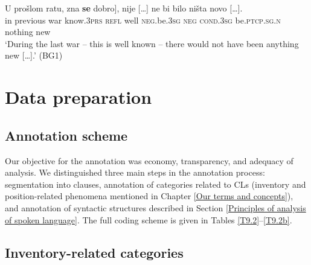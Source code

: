 \begin{enumerate}
\begin{exe}
\ex\label{(9.42)}
\gll U prošlom ratu, \minsp{[} zna \textbf{se} dobro], nije [\dots] ne bi bilo ništa {novo  [\dots].} \\
in previous war {} know.\textsc{3prs} \textsc{refl} well \textsc{neg}.be.3\textsc{sg} {} \textsc{neg} \textsc{cond}.\textsc{3sg} be.\textsc{ptcp}.\textsc{sg}.\textsc{n} nothing new \\
\glt ‘During the last war – this is well known – there would not have been anything new  [\dots].’ 
\hfill (BG1)
\end{exe}
\end{enumerate}

\section{Data preparation}
\label{Data preparation}
\subsection{Annotation scheme}
\label{Annotation scheme}
Our objective for the annotation was economy, transparency, and adequacy of analysis. We distinguished three main steps in the annotation process: segmentation into clauses, annotation of categories related to CLs (inventory and position-related phenomena mentioned in Chapter \ref{Our terms and concepts}), and annotation of syntactic structures described in Section \ref{Principles of analysis of spoken language}. The full coding scheme is given in Tables \ref{T9.2}--\ref{T9.2b}.

\subsection{Inventory-related categories}
\label{Inventory-related categories}

